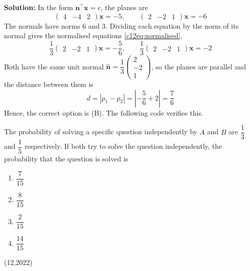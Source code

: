 \textbf{Solution:} In the form $\mathbf{n}^{\top}\mathbf{x} = c$, the planes are
\begin{equation}
\begin{pmatrix} 4 & -4 & 2 \end{pmatrix}\mathbf{x} = -5, \qquad
\begin{pmatrix} 2 & -2 & 1 \end{pmatrix}\mathbf{x} = -6
\end{equation}
The normals have norms $6$ and $3$. Dividing each equation by the norm of its normal gives the normalised equations \eqref{c12eq:normalised},
\begin{equation}
\frac{1}{3}\begin{pmatrix} 2 & -2 & 1 \end{pmatrix}\mathbf{x} = -\frac{5}{6}, \qquad
\frac{1}{3}\begin{pmatrix} 2 & -2 & 1 \end{pmatrix}\mathbf{x} = -2
\end{equation}
Both have the same unit normal $\hat{\mathbf{n}} = \dfrac{1}{3}\begin{pmatrix} 2 \\ -2 \\ 1 \end{pmatrix}$, so the planes are parallel and the distance between them is
\begin{equation}
d = \left|p_1 - p_2\right| = \left|-\frac{5}{6} + 2\right| = \frac{7}{6}
\end{equation}
Hence, the correct option is (B). The following code verifies this.

\nopagebreak[4]
\begin{center}
\end{center}

\item The probability of solving a specific question independently by $A$ and $B$ are $\dfrac{1}{3}$ and $\dfrac{1}{5}$ respectively. If both try to solve the question independently, the probability that the question is solved is
\begin{enumerate}[label=(\Alph*), noitemsep]
\item $\dfrac{7}{15}$
\item $\dfrac{8}{15}$
\item $\dfrac{2}{15}$
\item $\dfrac{14}{15}$
\end{enumerate}
\hfill (12,2022)

